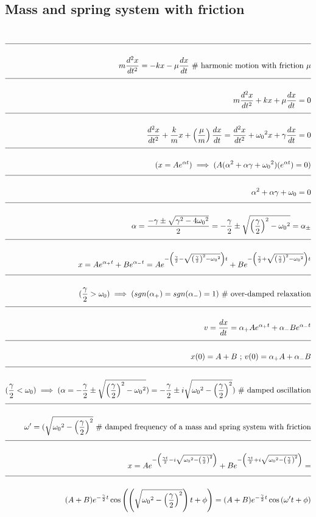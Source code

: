 \documentclass[a4paper]{article}
\newcommand{\eqComment}[1]{\text{  \# #1}}
\newcommand{\eqSep}{\text{ ;  }}
\newcommand{\sgn}[1]{sgn(#1)}
\newcommand{\n}{\\[1.5ex] \hline \nonumber \\[0ex]}
\begin{document}
\subsection{Mass and spring system with friction}
\begin{tcolorbox}
\begin{align}
\n m \frac{d^2x}{dt^2} = -k x - \mu \frac{dx}{dt} \eqComment{harmonic motion with friction $\mu$}
\n m \frac{d^2x}{dt^2} + k x + \mu \frac{dx}{dt} = 0
\n \frac{d^2x}{dt^2} + \frac{k}{m} x + \left(\frac{\mu}{m}\right) \frac{dx}{dt} = \frac{d^2x}{dt^2} + {\omega_0}^2 x + \gamma \frac{dx}{dt} = 0
\n (x = A e^{\alpha t}) \implies (A (\alpha^2 + \alpha \gamma + {\omega_0}^2) (e^{\alpha t}) = 0)
\n \alpha^2 + \alpha \gamma + {\omega_0} = 0
\n \alpha = \frac{-\gamma \pm \sqrt{\gamma^2 - 4 {\omega_0}^2}}{2} = -\frac{\gamma}{2} \pm \sqrt{\left(\frac{\gamma}{2}\right)^2 - {\omega_0}^2} = \alpha_\pm
\n x = A e^{\alpha_+ t} + B e^{\alpha_- t} = A e^{-\left(\frac{\gamma}{2} - \sqrt{\left(\frac{\gamma}{2}\right)^2 - {\omega_0}^2}\right) t} + B e^{-\left(\frac{\gamma}{2} + \sqrt{\left(\frac{\gamma}{2}\right)^2 - {\omega_0}^2}\right) t}
\n (\frac{\gamma}{2} > \omega_0) \implies (\sgn{\alpha_+} = \sgn{\alpha_-} = 1) \eqComment{over-damped relaxation}
\n v = \frac{dx}{dt} = \alpha_+ A e^{\alpha_+ t} + \alpha_- B e^{\alpha_- t}
\n x(0) = A + B \eqSep v(0) = \alpha_+ A + \alpha_- B
\n (\frac{\gamma}{2} < \omega_0) \implies (\alpha = -\frac{\gamma}{2} \pm \sqrt{\left(\frac{\gamma}{2}\right)^2 - {\omega_0}^2}) = -\frac{\gamma}{2} \pm i \sqrt{{\omega_0}^2 - \left(\frac{\gamma}{2}\right)^2}) \eqComment{damped oscillation}
\n \omega^\prime = (\sqrt{{\omega_0}^2 - \left(\frac{\gamma}{2}\right)^2} \eqComment{damped frequency of a mass and spring system with friction}
\n x = A e^{-\left(\frac{\gamma t}{2} - i \sqrt{{\omega_0}^2 - \left(\frac{\gamma}{2}\right)^2}\right)} + B e^{-\left(\frac{\gamma t}{2} + i \sqrt{{\omega_0}^2 - \left(\frac{\gamma}{2}\right)^2}\right)} = 
\n (A + B) e^{-\frac{\gamma}{2} t} \cos\left(\left(\sqrt{{\omega_0}^2 - \left(\frac{\gamma}{2}\right)^2}\right) t + \phi\right) = (A + B) e^{-\frac{\gamma}{2} t} \cos\left(\omega^\prime t + \phi\right)
\end{align}
\end{tcolorbox}
\end{document}
